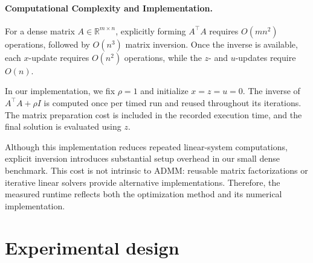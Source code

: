 \documentclass{article}
\begin{document}
\paragraph{Computational Complexity and Implementation.}
For a dense matrix $A\in\mathbb{R}^{m\times n}$,
explicitly forming $A^\top A$ requires
$O(mn^2)$ operations, followed by $O(n^3)$
matrix inversion. Once the inverse is available,
each $x$-update requires $O(n^2)$ operations,
while the $z$- and $u$-updates require $O(n)$.

In our implementation, we fix $\rho=1$ and
initialize $x=z=u=0$. The inverse of
$A^\top A+\rho I$ is computed once per timed run and reused throughout its iterations.
The matrix preparation cost is included in the
recorded execution time, and the final solution
is evaluated using $z$.

Although this implementation reduces repeated
linear-system computations, explicit inversion
introduces substantial setup overhead in our
small dense benchmark. This cost is not intrinsic
to ADMM: reusable matrix factorizations or
iterative linear solvers provide alternative
implementations. Therefore, the measured runtime
reflects both the optimization method and its
numerical implementation.

\section{Experimental design}
\end{document}
